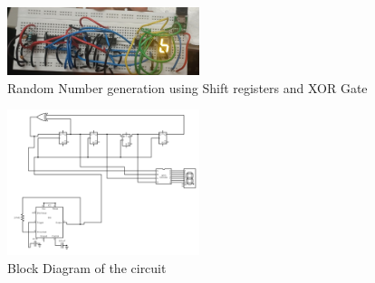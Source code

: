 \documentclass[12pt,onecolumn,notitlepage]{article}
\begin{document}
\begin{figure}[h!]
  \centering
  \includegraphics[width=0.5\textwidth]{circuit.jpg}
  \caption{Random Number generation using Shift registers and XOR Gate}
  \label{fig:Circuit}
\end{figure}
\begin{figure}[h!]
  \centering
  \includegraphics[width=0.5\textwidth]{blockdiagram.png}
  \caption{Block Diagram of the circuit}
  \label{fig:Block Diagram}
\end{figure}

 

 
\end{document}
